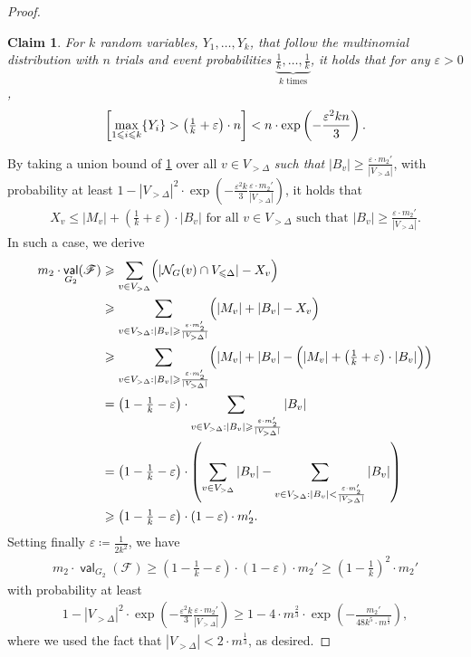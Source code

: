 \documentclass[11pt,fleqn]{article}
\renewcommand{\geq}{\geqslant}
\renewcommand{\leq}{\leqslant}
\renewcommand{\epsilon}{\varepsilon}
\newcommand{\defeq}{\coloneq}
\DeclareMathOperator{\val}{\mathsf{val}}
\newcommand{\nei}{\calN}
\newcommand{\sqcol}{\scrF}
\newcommand{\Vl}{V_{\leq \Delta}}
\newcommand{\Vg}{V_{> \Delta}}
\newcommand{\calN}{\mathcal{N}}
\newcommand{\scrF}{\mathscr{F}}
\let\Pr\relax\DeclareMathOperator*{\Pr}{\mathbb{P}}
\newtheorem{claim}[theorem]{Claim}
\theoremstyle{definition}
\numberwithin{equation}{section}
\begin{document}
\begin{proof}
\begin{claim}
\label{clm:Cut-alg:high-degree:multinomial}
For $k$ random variables, $Y_1, \ldots, Y_k$,
that follow the multinomial distribution with $n$ trials and
event probabilities $\underbrace{\tfrac{1}{k}, \ldots, \tfrac{1}{k}}_{k \text{ times}}$,
    it holds that for any $\epsilon > 0$,
    \begin{align}
        \Pr\left[
            \max_{1 \leq i \leq k} \{Y_i\}
            > \left(\tfrac{1}{k}+\epsilon\right) \cdot n
        \right]
        < n \cdot \exp\left(-\frac{\epsilon^2 k n}{3}\right).
    \end{align}
\end{claim}

By taking a union bound of \cref{clm:Cut-alg:high-degree:multinomial} 
over all $v \in \Vg$ \emph{such that}
$|B_v| \geq \frac{\epsilon \cdot m_2'}{|\Vg|}$,
with probability at least
$1-|\Vg|^2 \cdot \exp\left(-\frac{\epsilon^2 k}{3} \frac{\epsilon \cdot m_2'}{|\Vg|}\right)$,
it holds that
\begin{align}
    X_v \leq |M_v| + \left(\tfrac{1}{k}+\epsilon\right) \cdot |B_v|
    \text{ for all } v \in \Vg 
    \text{ such that } |B_v| \geq \frac{\epsilon \cdot m_2'}{|\Vg|}.
\end{align}
In such a case, we derive
\begin{align}
\begin{aligned}
    m_2 \cdot \val_{G_2}(\sqcol)
    & \geq \sum_{v \in \Vg} \Bigl( |\nei_G(v) \cap \Vl| - X_v \Bigr) \\
    & \geq \sum_{v \in \Vg: |B_v| \geq \frac{\epsilon \cdot m_2'}{|\Vg|}} \Bigl( |M_v| + |B_v| - X_v \Bigr) \\
    & \geq \sum_{v \in \Vg: |B_v| \geq \frac{\epsilon \cdot m_2'}{|\Vg|}}
        \Bigl( |M_v| + |B_v| - \Bigl(|M_v| + \left(\tfrac{1}{k}+\epsilon\right) \cdot |B_v|\Bigr) \Bigr) \\
    & = \left(1-\tfrac{1}{k}-\epsilon\right) \cdot
        \sum_{v \in \Vg: |B_v| \geq \frac{\epsilon \cdot m_2'}{|\Vg|}} |B_v| \\
    & = \left(1-\tfrac{1}{k}-\epsilon\right) \cdot \left(
        \sum_{v \in \Vg} |B_v| -
        \sum_{v \in \Vg: |B_v| < \frac{\epsilon \cdot m_2'}{|\Vg|}} |B_v|
        \right) \\
    & \geq \left(1-\tfrac{1}{k}-\epsilon\right) \cdot (1-\epsilon) \cdot m_2'.
\end{aligned}
\end{align}
Setting finally $\epsilon \defeq \frac{1}{2k^2}$,
we have
\begin{align}
    m_2 \cdot \val_{G_2}(\sqcol) \geq 
    \left(1-\tfrac{1}{k}-\epsilon\right) \cdot (1-\epsilon) \cdot m_2'
    \geq \left(1-\tfrac{1}{k}\right)^2 \cdot m_2'
\end{align}
with probability at least
\begin{align}
    1-|\Vg|^2 \cdot \exp\left(-\frac{\epsilon^2 k}{3} \frac{\epsilon \cdot m_2'}{|\Vg|}\right)
    \geq 1 - 4 \cdot m^{\frac{2}{3}} \cdot \exp\left(
        -\frac{m_2'}{48 k^5 \cdot m^\frac{1}{3}}
    \right),
\end{align}
where we used the fact that $|\Vg| < 2\cdot m^\frac{1}{3}$,
as desired.
\end{proof}
\end{document}
